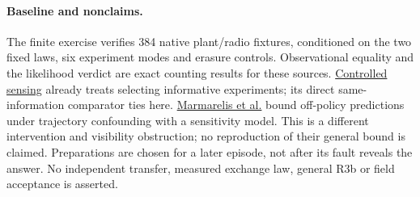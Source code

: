 \documentclass{article}
\begin{document}
\paragraph{Baseline and nonclaims.}
The finite exercise verifies 384 native plant/radio fixtures,
conditioned on the two fixed laws, six experiment modes and
erasure controls. Observational equality and the likelihood
verdict are exact counting results for these sources.
\href{https://arxiv.org/abs/1205.0858}{Controlled sensing}
already treats selecting informative experiments; its direct
same-information comparator ties here.
\href{https://proceedings.mlr.press/v286/marmarelis25a.html}
{Marmarelis et al.} bound off-policy predictions under
trajectory confounding with a sensitivity model. This is a
different intervention and visibility obstruction; no
reproduction of their general bound is claimed.
Preparations are chosen for a later episode, not after its fault
reveals the answer. No independent transfer, measured exchange
law, general R3b or field acceptance is asserted.
\end{document}
